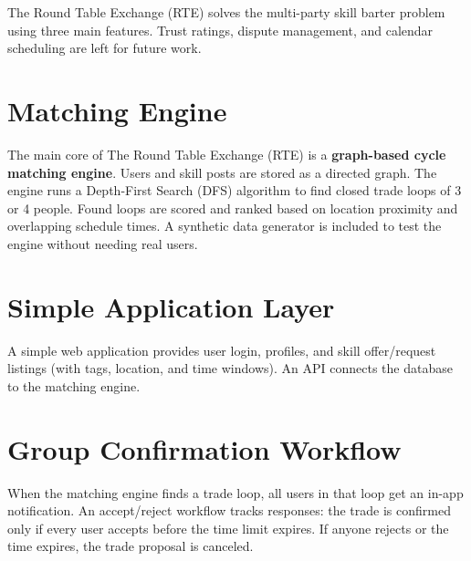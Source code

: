 The Round Table Exchange (RTE) solves the multi-party skill barter problem using three main features. Trust ratings, dispute management, and calendar scheduling are left for future work.

\section{Matching Engine}

The main core of The Round Table Exchange (RTE) is a \textbf{graph-based cycle matching engine}. Users and skill posts are stored as a directed graph. The engine runs a Depth-First Search (DFS) algorithm to find closed trade loops of 3 or 4 people. Found loops are scored and ranked based on location proximity and overlapping schedule times. A synthetic data generator is included to test the engine without needing real users.

\section{Simple Application Layer}

A simple web application provides user login, profiles, and skill offer/request listings (with tags, location, and time windows). An API connects the database to the matching engine.

\section{Group Confirmation Workflow}

When the matching engine finds a trade loop, all users in that loop get an in-app notification. An accept/reject workflow tracks responses: the trade is confirmed only if every user accepts before the time limit expires. If anyone rejects or the time expires, the trade proposal is canceled.
